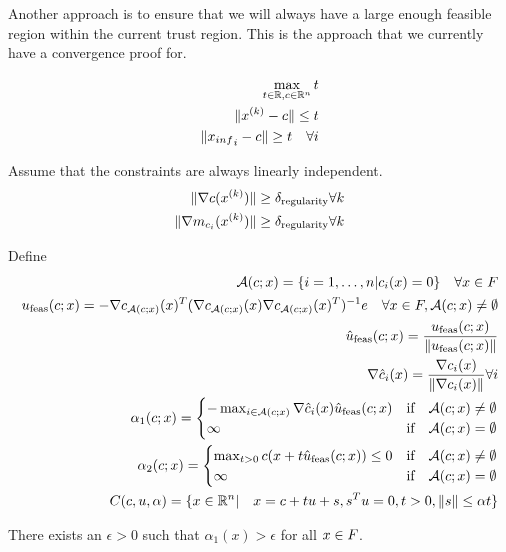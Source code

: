Another approach is to ensure that we will always have a large enough feasible region within the current trust region.
This is the approach that we currently have a convergence proof for.


\begin{align*}
\max_{t \in \mathbb R, c \in \mathbb R^n} t \\
\| {x^{(k)}} - c\| \le t \\
\| {x_{inf}}_i - c \| \ge t \quad \forall i
\end{align*}



Assume that the constraints are always linearly independent.
\begin{align*}
\|\nabla c({x^{(k)}})\| \ge {\delta_{\text{regularity}}} \forall k\\
\|\nabla m_{c_{i}}({x^{(k)}})\| \ge {\delta_{\text{regularity}}} \forall k
\end{align*}


Define
\begin{align*}
\mathcal A(c;x) = \{i =  1,\ldots, n| c_i(x) = 0\}  \quad \forall x \in {F} \\
{u_{\text{feas}}}(c;x) = -\nabla c_{\mathcal A(c;x)}(x)^T(\nabla c_{\mathcal A(c;x)}(x)\nabla c_{\mathcal A(c;x)}(x)^T)^{-1} e \quad \forall x \in {F},\mathcal A(c;x) \ne \emptyset \\
{\hat{u}_{\text{feas}}}(c;x) = \frac {{u_{\text{feas}}}(c;x)} {\| {u_{\text{feas}}} (c;x)\|}\\
\nabla \hat c_i(x) = \frac {\nabla c_i(x)}{\|\nabla c_i(x)\|} \forall i\\
\alpha_1(c;x) =
\begin{cases}
-\max_{i \in \mathcal A(c;x)} \nabla \hat c_i(x) {\hat{u}_{\text{feas}}}(c;x) & \text{if} \quad \mathcal A(c;x) \ne \emptyset \\
\infty & \text{if} \quad \mathcal A(c;x) = \emptyset
\end{cases} \\
\alpha_2(c;x) =
\begin{cases}
\max_{t > 0} c(x + t{\hat{u}_{\text{feas}}}(c;x)) \le 0 & \text{if} \quad \mathcal A(c;x) \ne \emptyset \\
\infty & \text{if} \quad \mathcal A(c;x) = \emptyset
\end{cases} \\
C(c, u, \alpha) = \{x \in \mathbb R^n | \quad x = c + t u + s, s^T u = 0, t > 0, \|s\| \le \alpha t\} \\
\end{align*}


\begin{theorem}
There exists an $\epsilon > 0$ such that $\alpha_1(x) > \epsilon$ for all $x \in {F}$.
\end{theorem}

